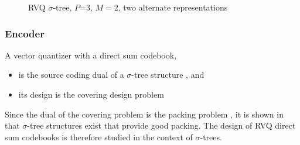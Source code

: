 \begin{Body}
								\begin{figure}[ht]
								\centering	
								\caption{RVQ $\sigma$-tree, $P$=3, $M=2$, two alternate representations} 
								\label{fig:RVQ_sigma_tree}				
								\end{figure}



\subsubsection{Encoder}
A vector quantizer with a direct sum codebook,

\begin{itemize}
\item is the source coding dual of a $\sigma$-tree structure \cite{1993_sigmaTrees_Barnes}, and
\item its design is the covering design problem
\end{itemize}

Since the dual of the covering problem is the packing problem \cite{BOOK_spheres_Conway}, it is shown in \cite{1993_sigmaTrees_Barnes} that $\sigma$-tree structures exist that provide good packing.  The design of RVQ direct sum codebooks is therefore studied in the context of $\sigma$-trees.


\end{Body}
